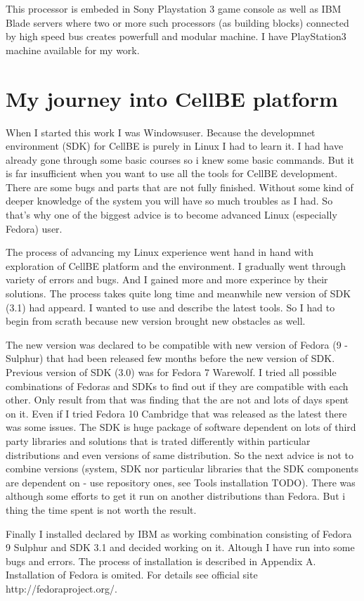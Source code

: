 This processor is embeded in Sony Playstation 3 game console as well as IBM Blade servers where two or more such processors (as building blocks) connected by high speed bus creates powerfull and modular machine. I have PlayStation3 machine available for my work.

\section{My journey into CellBE platform}
When I started this work I was Windows\textregistered user. Because the developmnet environment (SDK) for CellBE is purely in Linux I had to learn it. I had have already gone through some basic courses so i knew some basic commands. But it is far insufficient when you want to use all the tools for CellBE development. There are some bugs and parts that are not fully finished. Without some kind of deeper knowledge of the system you will have so much troubles as I had. So that's why one of the biggest advice is to become advanced Linux (especially Fedora) user.

The process of advancing my Linux experience went hand in hand with exploration of CellBE platform and the environment. I gradually went through variety of errors and bugs. And I gained more and more experince by their solutions. The process takes quite long time and meanwhile new version of SDK (3.1) had appeard. I wanted to use and describe the latest tools. So I had to begin from scrath because new version brought new obstacles as well.

The new version was declared to be compatible with new version of Fedora (9 - Sulphur) that had been released few months before the new version of SDK. Previous version of SDK (3.0) was for Fedora 7 Warewolf. I tried all possible combinations of Fedoras and SDKs to find out if they are compatible with each other. Only result from that was finding that the are not and lots of days spent on it. Even if I tried Fedora 10 Cambridge that was released as the latest there was some issues. The SDK is huge package of software dependent on lots of third party libraries and solutions that is trated differently within particular distributions and even versions of same distribution. So the next advice is not to combine versions (system, SDK nor particular libraries that the SDK components are dependent on - use repository ones, see Tools installation TODO). There was although some efforts to get it run on another distributions than Fedora. But i thing the time spent is not worth the result.

Finally I installed declared by IBM as working combination consisting of Fedora 9 Sulphur and SDK 3.1 and decided working on it. Altough I have run into some bugs and errors. The process of installation is described in Appendix A. Installation of Fedora is omited. For details see official site http://fedoraproject.org/.
